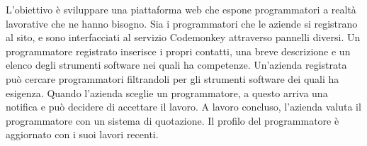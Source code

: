 \large
L'obiettivo è sviluppare una piattaforma web che espone programmatori a realtà lavorative che ne hanno bisogno.
Sia i programmatori che le aziende si registrano al sito, e sono interfacciati al servizio Codemonkey attraverso pannelli diversi.
Un programmatore registrato inserisce i propri contatti, una breve descrizione e un elenco degli strumenti software nei quali ha competenze.
Un'azienda registrata può cercare programmatori filtrandoli per gli strumenti software dei quali ha esigenza. Quando l'azienda sceglie un programmatore, a questo arriva una notifica e può decidere di accettare il lavoro.
A lavoro concluso, l'azienda valuta il programmatore con un sistema di quotazione.
Il profilo del programmatore è aggiornato con i suoi lavori recenti.
